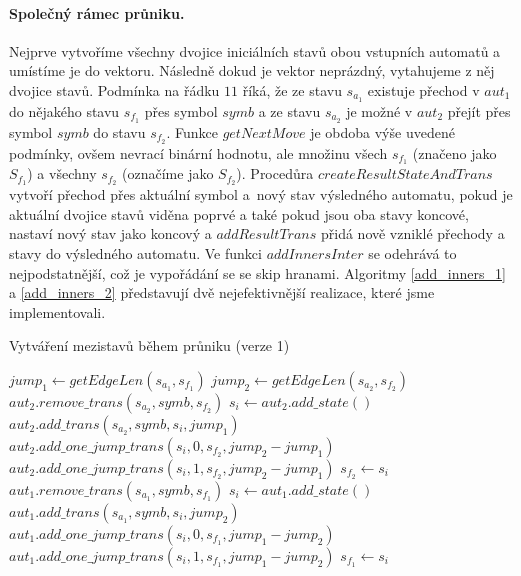 \paragraph{Společný rámec průniku.} Nejprve vytvoříme všechny dvojice iniciálních stavů obou vstupních automatů a umístíme je do vektoru. Následně dokud je vektor neprázdný, vytahujeme z něj dvojice stavů. Podmínka na řádku $11$ říká, že ze stavu $s_{a_1}$ existuje přechod v $aut_1$ do nějakého stavu $s_{f_1}$ přes symbol $symb$ a ze stavu $s_{a_2}$ je možné v $aut_2$ přejít přes symbol $symb$ do stavu $s_{f_2}$. Funkce $getNextMove$ je obdoba výše uvedené podmínky, ovšem nevrací binární hodnotu, ale množinu všech $s_{f_1}$ (značeno jako $S_{f_1}$) a všechny $s_{f_2}$ (označíme jako $S_{f_2}$). Procedůra $createResultStateAndTrans$ vytvoří přechod přes aktuální symbol a~nový stav výsledného automatu, pokud je aktuální dvojice stavů viděna poprvé a také pokud jsou oba stavy koncové, nastaví nový stav jako koncový a $addResultTrans$ přidá nově vzniklé přechody a stavy do výsledného automatu. Ve funkci $addInnersInter$ se odehrává to nejpodstatnější, což je vypořádání se se skip hranami. Algoritmy \ref{add_inners_1} a \ref{add_inners_2} představují dvě nejefektivnější realizace, které jsme implementovali.

\begin{algorithm}[t]
    \caption{Vytváření mezistavů během průniku (verze 1)}
    \label{add_inners_1}
        \begin{algorithmic}[1]
                \State $jump_1 \gets getEdgeLen(s_{a_1},s_{f_1})$
                \State $jump_2 \gets getEdgeLen(s_{a_2},s_{f_2})$
                    \State $aut_2.remove\_trans(s_{a_2}, symb, s_{f_2})$
                    \State $s_i \gets aut_2.add\_state()$
                    \State $aut_2.add\_trans(s_{a_2}, symb, s_i, jump_1)$
                    \State $aut_2.add\_one\_jump\_trans(s_i,0,s_{f_2},jump_2 - jump_1)$
                    \State $aut_2.add\_one\_jump\_trans(s_i,1,s_{f_2},jump_2 - jump_1)$
                    \State $s_{f_2} \gets s_i$
                \EndIf
                    \State $aut_1.remove\_trans(s_{a_1}, symb, s_{f_1})$
                    \State $s_i \gets aut_1.add\_state()$
                    \State $aut_1.add\_trans(s_{a_1}, symb, s_i, jump_2)$
                    \State $aut_1.add\_one\_jump\_trans(s_i,0,s_{f_1},jump_1 - jump_2)$
                    \State $aut_1.add\_one\_jump\_trans(s_i,1,s_{f_1},jump_1 - jump_2)$
                    \State $s_{f_1} \gets s_i$
                \EndIf
            \EndProcedure
        \end{algorithmic}
\end{algorithm}

